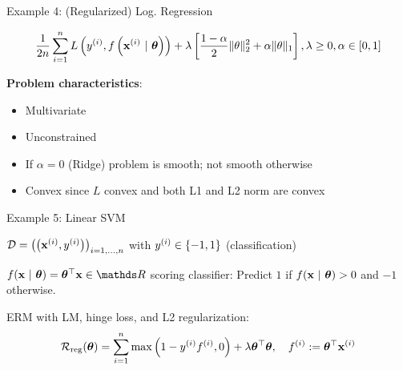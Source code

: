 \documentclass[11pt,compress,t,notes=noshow, xcolor=table]{beamer}
\begin{document}
\begin{framei}{Example 4: (Regularized) Log. Regression}
\item[] $$ \frac{1}{2n} \sum\limits_{i=1}^n L\left(y^{(i)}, f\left(\mathbf{x}^{(i)} ~|~ \bm{\theta}\right)\right) + \lambda \left[\frac{1-\alpha}{2}\|\theta\|^{2}_{2} + \alpha\|\theta\|_{1}\right], \lambda \geq 0, \alpha \in [0,1] $$
\spacer
\item \textbf{Problem characteristics}:
\begin{itemize}
\item Multivariate
\item Unconstrained
\item If $\alpha = 0$ (Ridge) problem is smooth; not smooth otherwise
\item Convex since $L$ convex and both L1 and L2 norm are convex
\end{itemize}
\end{framei}


\begin{framei}{Example 5: Linear SVM}
\item $\mathcal{D} = \left(\left(\mathbf{x}^{(i)}, y^{(i)}\right)\right)_{i = 1, ..., n}$ with $y^{(i)} \in \{-1, 1\}$ (classification)
\item $\fxt = \thetav^\top \xv \in \R$ scoring classifier: Predict $1$ if $f(\mathbf{x} ~|~ \bm{\theta}) > 0$ and $-1$ otherwise.
\item ERM with LM, hinge loss, and L2 regularization:
$$ \mathcal{R}_{\text{reg}}(\bm{\theta}) = \sum\limits_{i=1}^n \max\left(1 - y^{(i)} f^{(i)}, 0\right) + \lambda \bm{\theta}^\top \bm{\theta}, \quad f^{(i)} := \bm{\theta}^\top \mathbf{x}^{(i)} $$
\vfill
{}
\end{framei}
\end{document}
